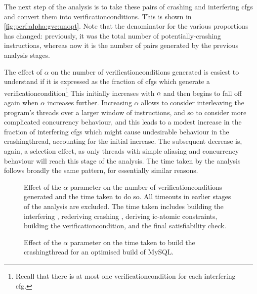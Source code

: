 The next step of the analysis is to take these pairs of crashing
{\StateMachines} and interfering \glspl{cfg} and convert them into
\glspl{verificationcondition}.  This is shown in
\autoref{fig:perf:alpha:gvc:unopt}.  Note that the denominator for
the various proportions has changed: previously, it was the total
number of potentially-crashing instructions, whereas now it is the
number of pairs generated by the previous analysis stages.

The effect of $\alpha$ on the number of \glspl{verificationcondition}
generated is easiest to understand if it is expressed as the fraction
of \glspl{cfg} which generate a
\gls{verificationcondition}\footnote{Recall that there is at most one
  \gls{verificationcondition} for each interfering \gls{cfg}.}  This
initially increases with $\alpha$ and then begins to fall off again
when $\alpha$ increases further.  Increasing $\alpha$ allows
{\technique} to consider interleaving the program's threads over a
larger window of instructions, and so to consider more complicated
concurrency behaviour, and this leads to a modest increase in the
fraction of interfering \glspl{cfg} which might cause undesirable
behaviour in the \gls{crashingthread}, accounting for the initial
increase.  The subsequent decrease is, again, a selection effect, as
only threads with simple aliasing and concurrency behaviour will reach
this stage of the analysis.  The time taken by the analysis follows
broadly the same pattern, for essentially similar reasons.

\begin{figure}
  \caption{Effect of the $\alpha$ parameter on the number of
    \glspl{verificationcondition} generated and the time taken to do
    so.  All timeouts in earlier stages of the analysis are excluded.
    The time taken includes building the interfering {\StateMachine},
    rederiving crashing {\StateMachine}, deriving \gls{ic-atomic}
    constraints, building the \gls{verificationcondition}, and the
    final satisfiability check.}
  \label{fig:perf:alpha:gvc:unopt}
\end{figure}

\begin{figure}
  \caption{Effect of the $\alpha$ parameter on the time taken to build
    the \gls{crashingthread} {\StateMachines} for an optimised build
    of MySQL.}
  \label{fig:perf:alpha:bpm:opt}
\end{figure}

